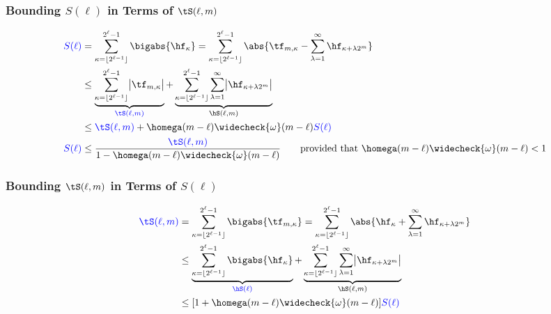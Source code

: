 \documentclass[10pt,compress]{beamer} %
\newcommand{\wcomega}{\widecheck{\omega}}
\begin{document}
\begin{frame}[label=SboundbytS]\frametitle{Bounding {\color{blue}$S(\ell)$} in Terms of {\color{blue}$\tS(\ell,m)$} }
\begin{align*}
{\color{blue}S(\ell)} &= \sum_{\kappa=\lfloor 2^{\ell-1} \rfloor}^{2^{\ell}-1} \bigabs{\hf_{\kappa}} = \sum_{\kappa=\lfloor 2^{\ell-1} \rfloor}^{2^{\ell}-1} \abs{\tf_{m,\kappa} - \sum_{\lambda=1}^{\infty} \hf_{\kappa+\lambda 2^{m}}} \\
& \le \underbrace{\sum_{\kappa=\lfloor 2^{\ell-1} \rfloor}^{2^{\ell}-1} \bigl \lvert \tf_{m,\kappa} \bigr\rvert}_{{\color{blue}\tS(\ell,m)}} + \underbrace{\sum_{\kappa=\lfloor 2^{\ell-1} \rfloor}^{2^{\ell}-1} \sum_{\lambda=1}^{\infty} \bigl \lvert \hf_{\kappa+\lambda 2^{m}}\bigr\rvert}_{\hS(\ell,m)} \\
&\le {\color{blue}\tS(\ell,m)} + \homega(m-\ell) \wcomega(m-\ell) {\color{blue}{S(\ell)}}  \\
{\color{blue}S(\ell)} & \le \frac{{\color{blue}\tS(\ell,m)}}{1 - \homega(m-\ell) \wcomega(m-\ell)} \qquad \text{provided that } \homega(m-\ell) \wcomega(m-\ell) < 1
\end{align*}
 \hfill \hfill {}
\end{frame}

\begin{frame}[label=tSboundbyS]\frametitle{Bounding {\color{blue}$\tS(\ell,m)$} in Terms of {\color{blue}$S(\ell)$}}
\begin{align*}
{\color{blue}\tS(\ell,m)} &= \sum_{\kappa=\lfloor 2^{\ell-1} \rfloor}^{2^{\ell}-1} \bigabs{\tf_{m,\kappa}} = \sum_{\kappa=\lfloor 2^{\ell-1} \rfloor}^{2^{\ell}-1} \abs{\hf_{\kappa} + \sum_{\lambda=1}^{\infty} \hf_{\kappa+\lambda 2^{m}}} \\
& \le \underbrace{\sum_{\kappa=\lfloor 2^{\ell-1} \rfloor}^{2^{\ell}-1} \bigabs{ \hf_{\kappa}}}_{{\color{blue}\hS(\ell)}} + \underbrace{\sum_{\kappa=\lfloor 2^{\ell-1} \rfloor}^{2^{\ell}-1} \sum_{\lambda=1}^{\infty} \bigl \lvert \hf_{\kappa+\lambda 2^{m}}\bigr\rvert}_{\hS(\ell,m)} \\
&\le [1 + \homega(m-\ell) \wcomega(m-\ell)] {\color{blue}{S(\ell)}}
\end{align*}
 \hfill \hfill {}
\end{frame}
\end{document}
